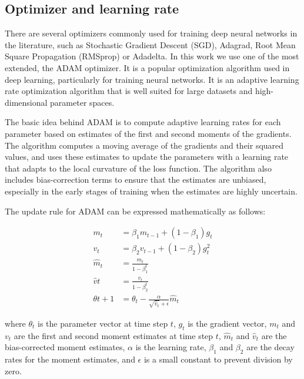 \subsection{Optimizer and learning rate}
\label{subsec:3_optimizer_and_lr}

There are several optimizers commonly used for training deep neural networks in the literature, such as Stochastic Gradient Descent (SGD), Adagrad, Root Mean Square Propagation (RMSprop) or Adadelta. In this work we use one of the most extended, the ADAM optimizer. It is a popular optimization algorithm used in deep learning, particularly for training neural networks. It is an adaptive learning rate optimization algorithm that is well suited for large datasets and high-dimensional parameter spaces.

The basic idea behind ADAM is to compute adaptive learning rates for each parameter based on estimates of the first and second moments of the gradients. The algorithm computes a moving average of the gradients and their squared values, and uses these estimates to update the parameters with a learning rate that adapts to the local curvature of the loss function. The algorithm also includes bias-correction terms to ensure that the estimates are unbiased, especially in the early stages of training when the estimates are highly uncertain.

The update rule for ADAM can be expressed mathematically as follows:

\begin{equation}
\begin{split}
	m_t &= \beta_1 m_{t-1} + (1-\beta_1) g_t \\
	v_t &= \beta_2 v_{t-1} + (1-\beta_2) g_t^2 \\
	\hat{m}_t &= \frac{m_t}{1-\beta_1^t} \\
	\hat{v}t &= \frac{v_t}{1-\beta_2^t} \\
	\theta{t+1} &= \theta_t - \frac{\alpha}{\sqrt{\hat{v}_t}+\epsilon} \hat{m}_t
\end{split}
\end{equation}

where $\theta_t$ is the parameter vector at time step $t$, $g_t$ is the gradient vector, $m_t$ and $v_t$ are the first and second moment estimates at time step $t$, $\hat{m}_t$ and $\hat{v}_t$ are the bias-corrected moment estimates, $\alpha$ is the learning rate, $\beta_1$ and $\beta_2$ are the decay rates for the moment estimates, and $\epsilon$ is a small constant to prevent division by zero.

